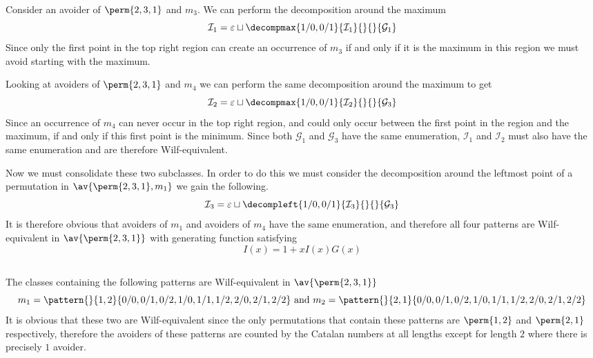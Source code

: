 Consider an avoider of \(\perm{2,3,1}\) and \(m_3\). We can perform
the decomposition around the maximum
\begin{equation*}
    \mathcal{I}_1 = \varepsilon \sqcup
    \decompmax{1/0,0/1}{\mathcal{I}_1}{}{}{\mathcal{G}_1}
\end{equation*}
Since only the first point in the top right region can
create an occurrence of \(m_3\) if and only if it is the
maximum in this region we must avoid starting with the maximum.

Looking at avoiders of \(\perm{2,3,1}\) and \(m_4\) we
can perform the same decomposition around the maximum to get
\begin{equation*}
    \mathcal{I}_2 = \varepsilon \sqcup
    \decompmax{1/0,0/1}{\mathcal{I}_2}{}{}{\mathcal{G}_3}
\end{equation*}
Since an occurrence of \(m_4\) can never occur in the
top right region, and could only occur between the first point
in the region and the maximum, if and only if this first point is the minimum.
Since both \(\mathcal{G}_1\) and \(\mathcal{G}_3\) have the same
enumeration, \(\mathcal{I}_1\) and \(\mathcal{I}_2\) must also have
the same enumeration and are therefore Wilf-equivalent.

Now we must consolidate these two subclasses. In order to do this we must
consider the decomposition around the leftmost point of a permutation in
\(\av{\perm{2,3,1},m_1}\) we gain the following.
\begin{equation*}
    \mathcal{I}_3 = \varepsilon \sqcup
    \decompleft{1/0,0/1}{\mathcal{I}_3}{}{}{\mathcal{G}_3}
\end{equation*}
It is therefore obvious that avoiders of \(m_1\) and avoiders of \(m_4\)
have the same enumeration, and therefore all four patterns are Wilf-equivalent
in \(\av{\perm{2,3,1}}\) with generating function satisfying
\begin{equation*}
    I(x) = 1 + xI(x)G(x)
\end{equation*}

\subsection{}
The classes containing the following patterns are Wilf-equivalent
in \(\av{\perm{2,3,1}}\)
\begin{equation*}
    m_1 = \pattern{}{1,2}{0/0,0/1,0/2,
                    1/0,1/1,1/2,
                    2/0,2/1,2/2}
    \text{ and }
    m_2 = \pattern{}{2,1}{0/0,0/1,0/2,
                    1/0,1/1,1/2,
                    2/0,2/1,2/2}
\end{equation*}
It is obvious that these two are Wilf-equivalent since the only
permutations that contain these patterns are \(\perm{1,2}\) and
\(\perm{2,1}\) respectively, therefore the avoiders of these patterns
are counted by the Catalan numbers at all lengths except for length
\(2\) where there is precisely \(1\) avoider.

